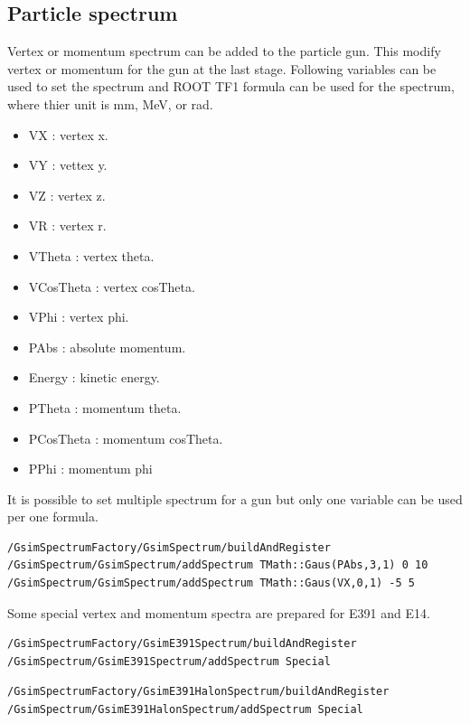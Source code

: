 \documentclass[a4paper,12pt]{article}
\begin{document}
 \subsection{Particle spectrum}
 Vertex or momentum spectrum can be added to the particle gun.
 This modify vertex or momentum for the gun at the last stage. 
 Following variables can be used to set the spectrum and
 ROOT TF1 formula can be used for the spectrum, where thier unit is mm,
  MeV, or rad.
 \begin{itemize}
  \item VX : vertex x.
  \item VY : vettex y.
  \item VZ : vertex z.
  \item VR : vertex r.
  \item VTheta : vertex theta.
  \item VCosTheta : vertex cosTheta.
  \item VPhi : vertex phi.
  \item PAbs : absolute momentum.
  \item Energy : kinetic energy.
  \item PTheta : momentum theta.
  \item PCosTheta : momentum cosTheta.
  \item PPhi : momentum phi
 \end{itemize}
 It is possible to set multiple spectrum for a gun but
 only one variable can be used per one formula.
 \begin{screen}
  \begin{verbatim}
/GsimSpectrumFactory/GsimSpectrum/buildAndRegister
/GsimSpectrum/GsimSpectrum/addSpectrum TMath::Gaus(PAbs,3,1) 0 10
/GsimSpectrum/GsimSpectrum/addSpectrum TMath::Gaus(VX,0,1) -5 5\end{verbatim}
 \end{screen}

  Some special vertex and momentum spectra are prepared for E391 and E14. 
  \begin{screen}
  \begin{verbatim}
/GsimSpectrumFactory/GsimE391Spectrum/buildAndRegister
/GsimSpectrum/GsimE391Spectrum/addSpectrum Special  \end{verbatim}
 \end{screen}

    \begin{screen}
  \begin{verbatim}
/GsimSpectrumFactory/GsimE391HalonSpectrum/buildAndRegister
/GsimSpectrum/GsimE391HalonSpectrum/addSpectrum Special  \end{verbatim}
 \end{screen}
\end{document}
